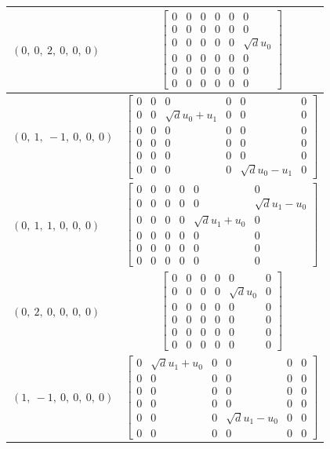 \documentclass[11pt]{article}
\theoremstyle{definition}
\begin{document}
\begin{longtable}{|l|c|}
    \hline
    $\left( 0, \  0, \  2, \  0, \  0, \  0\right)$ & ${\left[\begin{matrix}0 & 0 & 0 & 0 & 0 & 0\\0 & 0 & 0 & 0 & 0 & 0\\0 & 0 & 0 & 0 & 0 & \sqrt{d} u_{0}\\0 & 0 & 0 & 0 & 0 & 0\\0 & 0 & 0 & 0 & 0 & 0\\0 & 0 & 0 & 0 & 0 & 0\end{matrix}\right]}$ \\
    \hline
    $\left( 0, \  1, \  -1, \  0, \  0, \  0\right)$ & ${\left[\begin{matrix}0 & 0 & 0 & 0 & 0 & 0\\0 & 0 & \sqrt{d} u_{0} + u_{1} & 0 & 0 & 0\\0 & 0 & 0 & 0 & 0 & 0\\0 & 0 & 0 & 0 & 0 & 0\\0 & 0 & 0 & 0 & 0 & 0\\0 & 0 & 0 & 0 & \sqrt{d} u_{0} - u_{1} & 0\end{matrix}\right]}$ \\
    \hline
    $\left( 0, \  1, \  1, \  0, \  0, \  0\right)$ & ${\left[\begin{matrix}0 & 0 & 0 & 0 & 0 & 0\\0 & 0 & 0 & 0 & 0 & \sqrt{d} u_{1} - u_{0}\\0 & 0 & 0 & 0 & \sqrt{d} u_{1} + u_{0} & 0\\0 & 0 & 0 & 0 & 0 & 0\\0 & 0 & 0 & 0 & 0 & 0\\0 & 0 & 0 & 0 & 0 & 0\end{matrix}\right]}$ \\
    \hline
    $\left( 0, \  2, \  0, \  0, \  0, \  0\right)$ & ${\left[\begin{matrix}0 & 0 & 0 & 0 & 0 & 0\\0 & 0 & 0 & 0 & \sqrt{d} u_{0} & 0\\0 & 0 & 0 & 0 & 0 & 0\\0 & 0 & 0 & 0 & 0 & 0\\0 & 0 & 0 & 0 & 0 & 0\\0 & 0 & 0 & 0 & 0 & 0\end{matrix}\right]}$ \\
    \hline
    $\left( 1, \  -1, \  0, \  0, \  0, \  0\right)$ & ${\left[\begin{matrix}0 & \sqrt{d} u_{1} + u_{0} & 0 & 0 & 0 & 0\\0 & 0 & 0 & 0 & 0 & 0\\0 & 0 & 0 & 0 & 0 & 0\\0 & 0 & 0 & 0 & 0 & 0\\0 & 0 & 0 & \sqrt{d} u_{1} - u_{0} & 0 & 0\\0 & 0 & 0 & 0 & 0 & 0\end{matrix}\right]}$ \\

\end{longtable}
\end{document}
